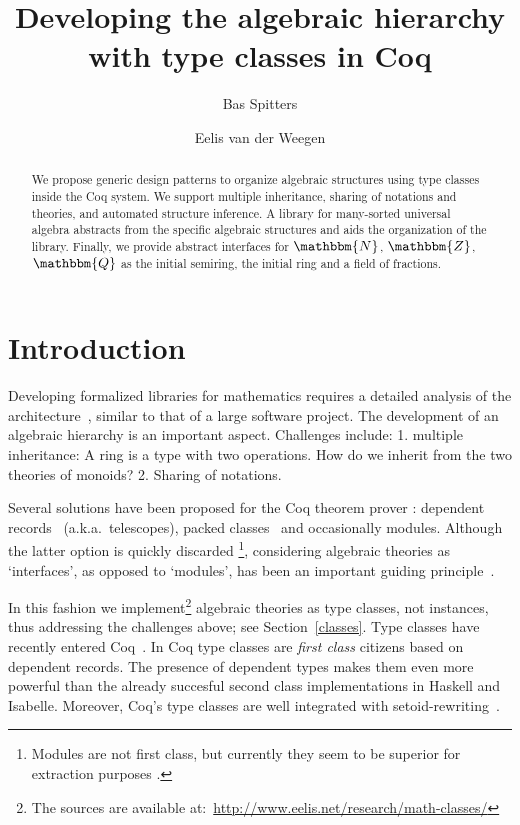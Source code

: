 \documentclass{llncs}
\newcommand{\N}{\ensuremath{\mathbbm{N}}}
\newcommand{\Z}{\ensuremath{\mathbbm{Z}}}
\newcommand{\Q}{\ensuremath{\mathbbm{Q}}}
\begin{document}
\title{Developing the algebraic hierarchy with type classes in Coq}
\author{Bas Spitters \and Eelis van der Weegen}
\maketitle
\begin{abstract}
We propose generic design patterns to organize algebraic structures using type classes inside the
Coq system. We support multiple inheritance, sharing of notations and theories, and automated
structure inference. A library for many-sorted universal algebra abstracts from the specific
algebraic structures and aids the organization of the library. Finally, we provide abstract
interfaces for $\N$, $\Z$, $\Q$ as the initial semiring, the initial ring and a field of
fractions.
\end{abstract}

\section{Introduction}
Developing formalized libraries for mathematics requires a detailed analysis of the architecture~\cite{C-corn,DBLP:conf/types/HaftmannW08}, similar to that of a large software project. 
The development of an algebraic hierarchy is an important aspect. Challenges include: 1. multiple
inheritance: A ring is a type with two operations. How do we inherit from the two theories of
monoids? 2. Sharing of notations. 

Several solutions have been proposed for the Coq theorem prover%
: dependent
records~\cite{DBLP:journals/jsc/GeuversPWZ02} (a.k.a.\ telescopes), packed classes~\cite{Packed} and
occasionally modules. Although the latter option is quickly discarded
\footnote{Modules are not first class, but currently they seem to be superior for extraction
purposes%
.}, considering
algebraic theories as `interfaces', as opposed to `modules', has been an important
guiding principle~\cite{Packed}.

In this fashion we implement\footnote{The sources are available
at:~\url{http://www.eelis.net/research/math-classes/}}
 algebraic theories as type classes, not instances, thus addressing the
challenges above; see Section~\ref{classes}. Type classes have recently entered Coq~\cite{DBLP:conf/tphol/SozeauO08}. In Coq
type classes are \emph{first class} citizens based on dependent records. The presence of dependent types makes them even more
powerful than the already succesful second class implementations in Haskell and Isabelle. Moreover,
Coq's type classes are well integrated with setoid-rewriting~\cite{Setoid-rewrite}.
\end{document}
